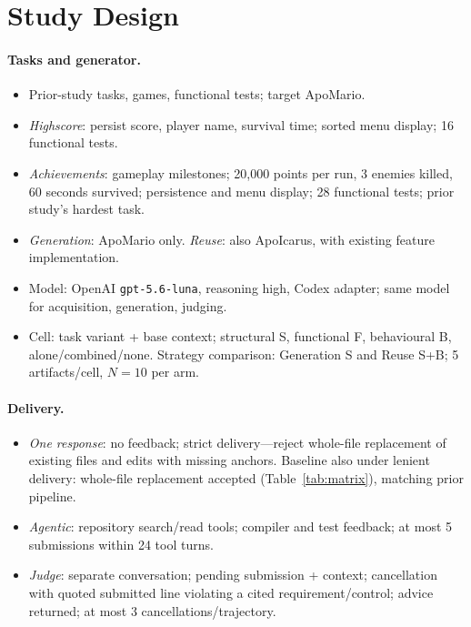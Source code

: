 \section{Study Design}
\label{sec:method}

\paragraph{Tasks and generator.}
\begin{itemize}
\item Prior-study tasks, games, functional tests; target ApoMario.
\item \emph{Highscore}: persist score, player name, survival time;
sorted menu display; 16 functional tests.
\item \emph{Achievements}: gameplay milestones; 20,000 points per run,
3 enemies killed, 60 seconds survived; persistence and menu display;
28 functional tests; prior study's hardest task.
\item \emph{Generation}: ApoMario only. \emph{Reuse}: also ApoIcarus,
with existing feature implementation.
\item Model: OpenAI \texttt{gpt-5.6-luna}, reasoning high, Codex adapter;
same model for acquisition, generation, judging.
\item Cell: task variant + base context; structural S, functional F,
behavioural B, alone/combined/none. Strategy comparison: Generation S
and Reuse S+B; 5 artifacts/cell, $N=10$ per arm.
\end{itemize}

\paragraph{Delivery.}
\begin{itemize}
\item \emph{One response}: no feedback; strict delivery---reject
whole-file replacement of existing files and edits with missing anchors.
Baseline also under lenient delivery: whole-file replacement accepted
(Table~\ref{tab:matrix}), matching prior pipeline.
\item \emph{Agentic}: repository search/read tools; compiler and test
feedback; at most 5 submissions within 24 tool turns.
\item \emph{Judge}: separate conversation; pending submission + context;
cancellation with quoted submitted line violating a cited requirement/control;
advice returned; at most 3 cancellations/trajectory.
\end{itemize}

